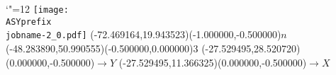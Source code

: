 \setlength{\unitlength}{1pt}
\makeatletter%
\let\ASYencoding\f@encoding%
\let\ASYfamily\f@family%
\let\ASYseries\f@series%
\let\ASYshape\f@shape%
\makeatother%
{\catcode`"=12%
\texttt{[image: \\ASYprefix\\jobname-2\_0.pdf]}%
}%
\color{ASYcolor}
\fontsize{12.000000}{14.400000}\selectfont
\usefont{\ASYencoding}{\ASYfamily}{\ASYseries}{\ASYshape}%
\ASYalign(-72.469164,19.943523)(-1.000000,-0.500000){$n$}%
\color{ASYcolor}
\fontsize{12.000000}{14.400000}\selectfont
\ASYalign(-48.283890,50.990555)(-0.500000,0.000000){$3$}%
\color{ASYcolor}
\fontsize{12.000000}{14.400000}\selectfont
\ASYalign(-27.529495,28.520720)(0.000000,-0.500000){$\rightarrow Y$}%
\color{ASYcolor}
\fontsize{12.000000}{14.400000}\selectfont
\ASYalign(-27.529495,11.366325)(0.000000,-0.500000){$\rightarrow X$}%
